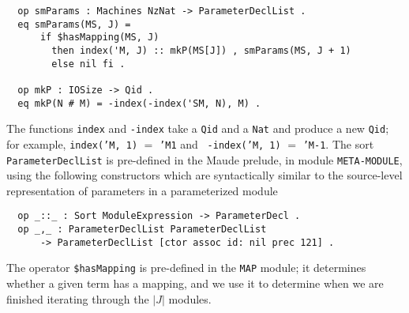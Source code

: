 \documentclass[copyright,creativecommons]{eptcs}
\begin{document}
\begin{center}
\begin{small}
\begin{boxedminipage}{0.75\textwidth}
\begin{verbatim}
  op smParams : Machines NzNat -> ParameterDeclList .
  eq smParams(MS, J) = 
      if $hasMapping(MS, J)
        then index('M, J) :: mkP(MS[J]) , smParams(MS, J + 1)
        else nil fi .

  op mkP : IOSize -> Qid .
  eq mkP(N # M) = -index(-index('SM, N), M) .
\end{verbatim}
\end{boxedminipage}
\end{small}
\end{center}

\noindent
The functions {\tt index} and {\tt -index} take a {\tt Qid} and a {\tt Nat} and
produce a new {\tt Qid}; for example, {\tt index('M, 1)} $=$ {\tt 'M1} and {\tt
-index('M, 1)} $=$ {\tt 'M-1}. The sort {\tt ParameterDeclList} is pre-defined
in the Maude prelude, in module {\tt META-MODULE}, using the following
constructors which are syntactically similar to the source-level representation
of parameters in a parameterized module

\begin{center}
\begin{small}
\begin{boxedminipage}{0.75\textwidth}
\begin{verbatim}
  op _::_ : Sort ModuleExpression -> ParameterDecl .
  op _,_ : ParameterDeclList ParameterDeclList 
      -> ParameterDeclList [ctor assoc id: nil prec 121] .
\end{verbatim}
\end{boxedminipage}
\end{small}
\end{center}

\noindent
The operator {\tt \$hasMapping} is pre-defined in the {\tt MAP} module; it
determines whether a given term has a mapping, and we use it to determine when
we are finished iterating through the $\vert J \vert$ modules.
\end{document}
